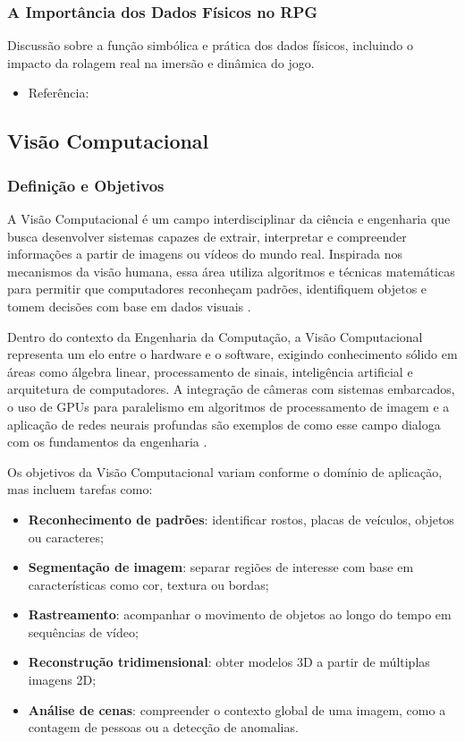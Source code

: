 \subsubsection{A Importância dos Dados Físicos no RPG}
Discussão sobre a função simbólica e prática dos dados físicos, incluindo o impacto da rolagem real na 
imersão e dinâmica do jogo.
\begin{itemize}
    \item Referência: \cite{hitchens2007roleplaying}
\end{itemize}

\subsection{Visão Computacional}

\subsubsection{Definição e Objetivos}

A Visão Computacional é um campo interdisciplinar da ciência e engenharia que busca desenvolver sistemas
capazes de extrair, interpretar e compreender informações a partir de imagens ou vídeos do mundo real. 
Inspirada nos mecanismos da visão humana, essa área utiliza algoritmos e técnicas matemáticas para permitir 
que computadores reconheçam padrões, identifiquem objetos e tomem decisões com base em dados visuais 
\cite{szeliski2010computer}.

Dentro do contexto da Engenharia da Computação, a Visão Computacional representa um elo entre o hardware e 
o software, exigindo conhecimento sólido em áreas como álgebra linear, processamento de sinais, inteligência 
artificial e arquitetura de computadores. A integração de câmeras com sistemas embarcados, o uso de GPUs 
para paralelismo em algoritmos de processamento de imagem e a aplicação de redes neurais profundas são 
exemplos de como esse campo dialoga com os fundamentos da engenharia \cite{bishop2006pattern}.

Os objetivos da Visão Computacional variam conforme o domínio de aplicação, mas incluem tarefas como:

\begin{itemize}
\item \textbf{Reconhecimento de padrões}: identificar rostos, placas de veículos, objetos ou caracteres;
\item \textbf{Segmentação de imagem}: separar regiões de interesse com base em características como cor, 
textura ou bordas;
\item \textbf{Rastreamento}: acompanhar o movimento de objetos ao longo do tempo em sequências de vídeo;
\item \textbf{Reconstrução tridimensional}: obter modelos 3D a partir de múltiplas imagens 2D;
\item \textbf{Análise de cenas}: compreender o contexto global de uma imagem, como a contagem de 
pessoas ou a detecção de anomalias.
\end{itemize}

